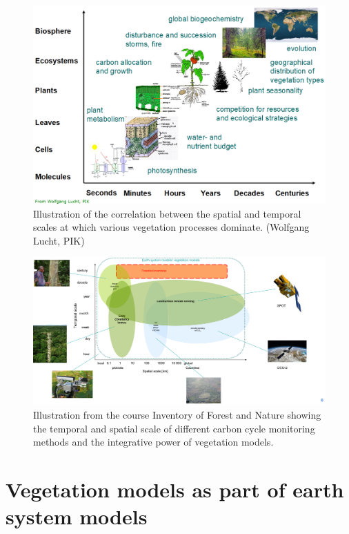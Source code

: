 \documentclass[12pt,oneside]{book}
\begin{document}
\begin{figure}

{\centering \includegraphics[width=0.8\linewidth]{figures/chap9/f91_lucht} 

}

\caption{Illustration of the correlation between the spatial and temporal scales at which various vegetation processes dominate. (Wolfgang Lucht, PIK)}\label{fig:f91}
\end{figure}

\begin{figure}

{\centering \includegraphics[width=0.8\linewidth]{figures/chap9/f92_upscaling} 

}

\caption{Illustration from the course Inventory of Forest and Nature showing the temporal and spatial scale of different carbon cycle monitoring methods and the integrative power of vegetation models.}\label{fig:f92}
\end{figure}

\section{Vegetation models as part of earth system
models}\label{vegetation-models-as-part-of-earth-system-models}
\end{document}
